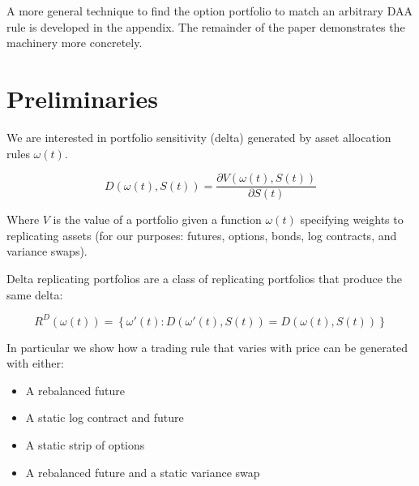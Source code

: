 \documentclass[12pt]{article}
\begin{document}
A more general technique to find the option portfolio to match an arbitrary DAA rule is developed in the appendix. The remainder of the paper demonstrates the machinery more concretely. %



\section{Preliminaries}

We are interested in portfolio sensitivity (delta) generated by asset allocation rules $\omega(t)$. 

\begin{equation}
 D(\omega(t), S(t)) = \frac{\partial V(\omega(t), S(t))}{\partial S(t)}
\end{equation}
  
Where $V$ is the value of a portfolio given a function $\omega(t)$ specifying weights to replicating assets (for our purposes: futures, options, bonds, log contracts, and variance swaps). 

Delta replicating portfolios are a class of replicating portfolios that produce the same delta: 

\begin{equation*}
R^D(\omega(t)) = \left \{ \omega'(t):   D(\omega'(t), S(t)) =  D(\omega(t), S(t))  \right\}   
\end{equation*}
 

In particular we show how a trading rule that varies with price can be generated with either:

\begin{itemize}
    \item A rebalanced future
    \item A static log contract and future
    \item A static strip of options
    \item A rebalanced future and a static variance swap
\end{itemize}



\end{document}
